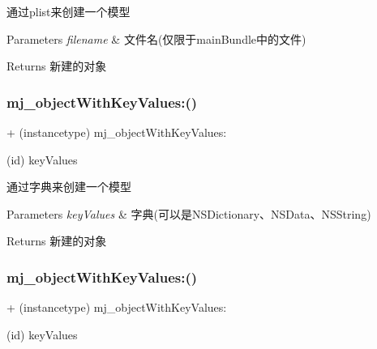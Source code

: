 通过plist来创建一个模型 
\begin{DoxyParams}{Parameters}
{\em filename} & 文件名(仅限于main\+Bundle中的文件) \\
\hline
\end{DoxyParams}
\begin{DoxyReturn}{Returns}
新建的对象 
\end{DoxyReturn}
\mbox{\label{category_n_s_object_07_m_j_key_value_08_a8620ab8d9fd3e832d4f8de504f49724d}} 
\subsubsection{\texorpdfstring{mj\+\_\+object\+With\+Key\+Values\+:()}{mj\_objectWithKeyValues:()}\hspace{0.1cm}{\footnotesize\ttfamily [1/3]}}
{\footnotesize\ttfamily + (instancetype) mj\+\_\+object\+With\+Key\+Values\+: \begin{DoxyParamCaption}\item[{(id)}]{key\+Values }\end{DoxyParamCaption}}

通过字典来创建一个模型 
\begin{DoxyParams}{Parameters}
{\em key\+Values} & 字典(可以是\+N\+S\+Dictionary、\+N\+S\+Data、\+N\+S\+String) \\
\hline
\end{DoxyParams}
\begin{DoxyReturn}{Returns}
新建的对象 
\end{DoxyReturn}
\mbox{\label{category_n_s_object_07_m_j_key_value_08_a8620ab8d9fd3e832d4f8de504f49724d}} 
\subsubsection{\texorpdfstring{mj\+\_\+object\+With\+Key\+Values\+:()}{mj\_objectWithKeyValues:()}\hspace{0.1cm}{\footnotesize\ttfamily [2/3]}}
{\footnotesize\ttfamily + (instancetype) mj\+\_\+object\+With\+Key\+Values\+: \begin{DoxyParamCaption}\item[{(id)}]{key\+Values }\end{DoxyParamCaption}}

